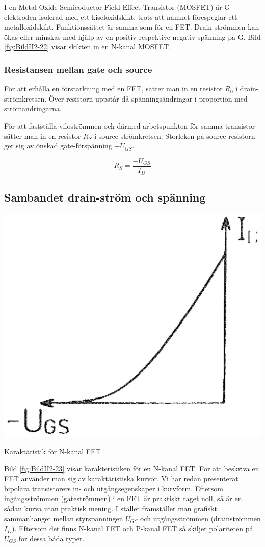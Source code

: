 I en Metal Oxide Semicoductor Field Effect Transistor (MOSFET) är
G-elektroden isolerad med ett kiseloxidskikt, trots att namnet förespeglar
ett metalloxidskikt. Funktionssättet är samma som för en FET.
Drain-strömmen kan ökas eller minskas med hjälp av en
positiv respektive negativ spänning på G. Bild \ref{fig:BildII2-22} visar skikten in en N-kanal MOSFET.

\subsubsection{Resistansen mellan gate och source}

För att erhålla en förstärkning med en FET, sätter man in en resistor
\(R_0\) i drain-strömkretsen.
Över resistorn uppstår då spänningsändringar i proportion med strömändringarna.

För att fastställa viloströmmen och därmed arbetspunkten för samma transistor
sätter man in en resistor \(R_S\) i source-strömkretsen.
Storleken på source-resistorn ger sig av önskad gate-förspänning \(-U_{GS}\).

\[	R_S = \dfrac{-U_{GS}}{I_D}	\]

\subsection{Sambandet drain-ström och spänning}

\begin{marginfigure}
\includegraphics[width=.5\textwidth]{images/cropped_pdfs/bild_2_2-23.pdf}
\caption{Karaktäristik för N-kanal FET}
\label{fig:BildII2-23}
\end{marginfigure}

Bild \ref{fig:BildII2-23} visar karakteristiken för en N-kanal FET.
För att beskriva en FET använder man sig av karaktäristiska kurvor.
Vi har redan presenterat bipolära transistorers in- och utgångsegenskaper i
kurvform.
Eftersom ingångsströmmen (gateströmmen) i en FET är praktiskt taget noll, så är
en sådan kurva utan praktisk mening.
I stället framställer man grafiskt sammanhanget mellan styrspänningen
\(U_{GS}\) och utgångsströmmen (drainströmmen \(I_D\)).
Eftersom det finns N-kanal FET och P-kanal FET så skiljer polariteten
på \(U_{GS}\) för dessa båda typer.
